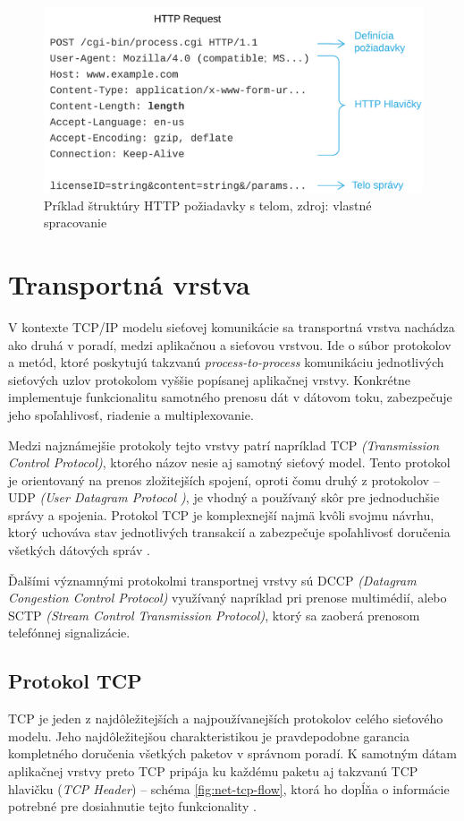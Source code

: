 \documentclass[
  printed, %
  table,   %
  lof,     %
  nolot,   %
  nocover
]{fithesis3}
\begin{document}
\begin{figure}[h]
  \centering
    \includegraphics[width=.97\textwidth]{images/net-http.png}
  \caption{Príklad štruktúry HTTP požiadavky s telom, zdroj: vlastné spracovanie}
  \label{fig:net-http}
\end{figure}

\section{Transportná vrstva}
V kontexte TCP/IP modelu sieťovej komunikácie sa transportná vrstva nachádza
ako druhá v poradí, medzi aplikačnou a sieťovou vrstvou. Ide o súbor protokolov
a metód, ktoré poskytujú takzvanú \textit{process-to-process} komunikáciu
jednotlivých sieťových uzlov protokolom vyššie popísanej aplikačnej vrstvy.
Konkrétne implementuje funkcionalitu samotného prenosu dát v dátovom toku,
zabezpečuje jeho spoľahlivosť, riadenie a multiplexovanie. 

Medzi najznámejšie protokoly tejto vrstvy patrí napríklad TCP
\textit{(Transmission Control Protocol)}, ktorého názov nesie aj samotný
sieťový model. Tento protokol je orientovaný na prenos zložitejších spojení,
oproti čomu druhý z protokolov -- UDP \textit{(User Datagram Protocol )}, je
vhodný a používaný skôr pre jednoduchšie správy a spojenia. Protokol TCP je
komplexnejší najmä kvôli svojmu návrhu, ktorý uchováva stav jednotlivých
transakcií a zabezpečuje spoľahlivosť doručenia všetkých dátových správ \cite{rfc1122}. 

Ďalšími
významnými protokolmi transportnej vrstvy sú DCCP
\textit{(Datagram Congestion Control Protocol)} využívaný napríklad pri prenose
multimédií, alebo SCTP \textit{(Stream Control Transmission Protocol)}, ktorý
sa zaoberá prenosom telefónnej signalizácie.

\subsection{Protokol TCP}
TCP je jeden z najdôležitejších a najpoužívanejších protokolov celého sieťového
modelu. Jeho najdôležitejšou charakteristikou je
pravdepodobne garancia kompletného doručenia všetkých paketov v správnom
poradí. K samotným dátam aplikačnej vrstvy preto TCP pripája ku každému paketu
aj takzvanú TCP hlavičku (\textit{TCP Header}) -- schéma \ref{fig:net-tcp-flow}, ktorá ho dopĺňa o informácie
potrebné pre dosiahnutie tejto funkcionality \cite{FIDIS:TCP}.
\end{document}
